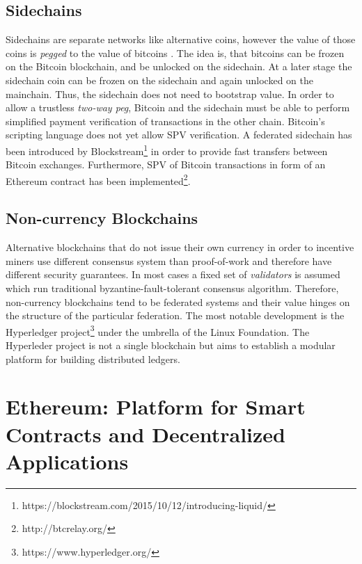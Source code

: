 \subsection{Sidechains}
Sidechains are separate networks like alternative coins, however the value of those coins is \emph{pegged} to the value of bitcoins \parencite{backenabling}. The idea is, that bitcoins can be frozen on the Bitcoin blockchain, and be unlocked on the sidechain. At a later stage the sidechain coin can be frozen on the sidechain and again unlocked on the mainchain. Thus, the sidechain does not need to bootstrap value.
In order to allow a trustless \emph{two-way peg}, Bitcoin and the sidechain must be able to perform simplified payment verification of transactions in the other chain. Bitcoin's scripting language does not yet allow SPV verification. A federated sidechain has been introduced by Blockstream\footnote{https://blockstream.com/2015/10/12/introducing-liquid/} in order to provide fast transfers between Bitcoin exchanges. Furthermore, \ac{SPV} of Bitcoin transactions in form of an Ethereum contract has been implemented\footnote{http://btcrelay.org/}.

\subsection{Non-currency Blockchains}

Alternative blockchains that do not issue their own currency in order to incentive miners use different consensus system than proof-of-work and therefore have different security guarantees. In most cases a fixed set of \emph{validators} is assumed which run traditional byzantine-fault-tolerant consensus algorithm. Therefore, non-currency blockchains tend to be federated systems and their value hinges on the structure of the particular federation. The most notable development is the Hyperledger project\footnote{https://www.hyperledger.org/} under the umbrella of the Linux Foundation. The Hyperleder project is not a single blockchain but aims to establish a modular platform for building distributed ledgers.



\section{Ethereum: Platform for Smart Contracts and Decentralized Applications}
\label{sec:ethereum}

